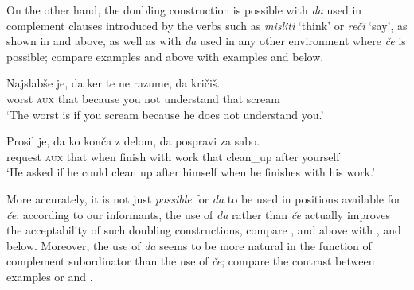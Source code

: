 \documentclass[output=paper,
]{langscibook}
\begin{document}
\begin{exe} 
\end{exe}

\noindent On the other hand, the doubling construction is possible with \textit{da} used in complement clauses introduced by the verbs such as \textit{misliti} `think' or \textit{reči} `say', as shown in  and  above, as well as with \textit{da} used in any other environment where \textit{če} is possible; compare examples  and  above with examples  and  below. 

\begin{exe} 
\ex \label{ex:plesnicar:nineteen}
\gll Najslabše	je, 	da 	ker 		te	ne 	razume, 	da 	kričiš.\\
 worst		\textsc{aux}	that	because	you	not	understand	that     scream \\
\trans `The worst is if you scream because he does not understand you.' 
\end{exe}

\begin{exe} 
\ex \label{ex:plesnicar:twenty}
\gll Prosil 		je, 	da 	ko 	konča	 z 	delom, da 	pospravi za 	sabo.\\	
request		\textsc{aux}	that	when	finish	with	work	that 	clean\_up after	yourself \\
\trans `He asked if he could clean up after himself when he finishes with his work.' 
\end{exe}

\noindent More accurately, it is not just \textit{possible} for \textit{da} to be used in positions available for \textit{če}: according to our informants, the use of \textit{da} rather than \textit{če} actually improves the acceptability of such doubling constructions, compare ,  and  above with ,  and  below. Moreover, the use of \textit{da} seems to be more natural in the function of complement subordinator than the use of \textit{če}; compare the contrast between examples  or  and .
\end{document}
